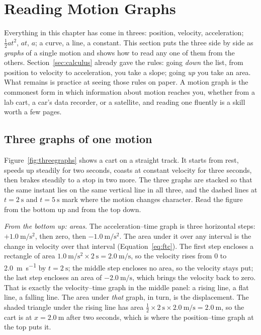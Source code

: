 \documentclass[11pt,twoside,openany]{book}
\begin{document}
\section{Reading Motion Graphs}
\label{sec:graphs}

Everything in this chapter has come in threes: position, velocity, acceleration; $\tfrac12 a t^2$, $at$, $a$; a curve, a line, a constant. This section puts the three side by side as \emph{graphs} of a single motion and shows how to read any one of them from the others. Section~\ref{sec:calculus} already gave the rules: going \emph{down} the list, from position to velocity to acceleration, you take a slope; going \emph{up} you take an area. What remains is practice at seeing those rules on paper. A motion graph is the commonest form in which information about motion reaches you, whether from a lab cart, a car's data recorder, or a satellite, and reading one fluently is a skill worth a few pages.

\subsection{Three graphs of one motion}

Figure~\ref{fig:threegraphs} shows a cart on a straight track. It starts from rest, speeds up steadily for two seconds, coasts at constant velocity for three seconds, then brakes steadily to a stop in two more. The three graphs are stacked so that the same instant lies on the same vertical line in all three, and the dashed lines at $t = \SI{2}{\second}$ and $t = \SI{5}{\second}$ mark where the motion changes character. Read the figure from the bottom up and from the top down.

\emph{From the bottom up: areas.} The acceleration--time graph is three horizontal steps: $+\SI{1.0}{\metre\per\second\squared}$, then zero, then $\SI{-1.0}{\metre\per\second\squared}$. The area under it over any interval is the change in velocity over that interval (Equation~\eqref{eq:ftc}). The first step encloses a rectangle of area $\SI{1.0}{\metre\per\second\squared} \times \SI{2}{\second} = \SI{2.0}{\metre\per\second}$, so the velocity rises from $0$ to \SI{2.0}{\metre\per\second} by $t = \SI{2}{\second}$; the middle step encloses no area, so the velocity stays put; the last step encloses an area of $\SI{-2.0}{\metre\per\second}$, which brings the velocity back to zero. That is exactly the velocity--time graph in the middle panel: a rising line, a flat line, a falling line. The area under \emph{that} graph, in turn, is the displacement. The shaded triangle under the rising line has area $\tfrac12 \times \SI{2}{\second} \times \SI{2.0}{\metre\per\second} = \SI{2.0}{\metre}$, so the cart is at $x = \SI{2.0}{\metre}$ after two seconds, which is where the position--time graph at the top puts it.
\end{document}
